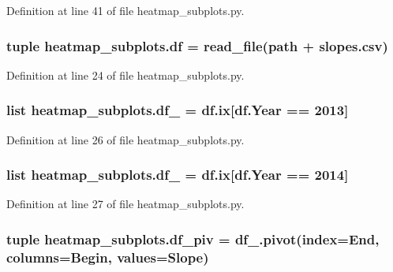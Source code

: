Definition at line 41 of file heatmap\+\_\+subplots.\+py.

\hypertarget{namespaceheatmap__subplots_aefdcfb560a154ac398cf52bf39a33cb0}{}
\subsubsection[{df}]{\setlength{\rightskip}{0pt plus 5cm}tuple heatmap\+\_\+subplots.\+df = {\bf read\+\_\+file}({\bf path} + \textquotesingle{}slopes.\+csv\textquotesingle{})}\label{namespaceheatmap__subplots_aefdcfb560a154ac398cf52bf39a33cb0}


Definition at line 24 of file heatmap\+\_\+subplots.\+py.

\hypertarget{namespaceheatmap__subplots_a38f24e9de53aa8a935925a0154e4b576}{}
\subsubsection[{df\+\_\+13}]{\setlength{\rightskip}{0pt plus 5cm}list heatmap\+\_\+subplots.\+df\+\_ = df.\+ix\mbox{[}df.\+Year == 2013\mbox{]}}\label{namespaceheatmap__subplots_a38f24e9de53aa8a935925a0154e4b576}


Definition at line 26 of file heatmap\+\_\+subplots.\+py.

\hypertarget{namespaceheatmap__subplots_a664795795d2c75a026821e0bd2a32159}{}
\subsubsection[{df\+\_\+14}]{\setlength{\rightskip}{0pt plus 5cm}list heatmap\+\_\+subplots.\+df\+\_ = df.\+ix\mbox{[}df.\+Year == 2014\mbox{]}}\label{namespaceheatmap__subplots_a664795795d2c75a026821e0bd2a32159}


Definition at line 27 of file heatmap\+\_\+subplots.\+py.

\hypertarget{namespaceheatmap__subplots_af3b54e7f6c49dd1ad4ed6d5cef1541d0}{}
\subsubsection[{df\+\_\+piv}]{\setlength{\rightskip}{0pt plus 5cm}tuple heatmap\+\_\+subplots.\+df\+\_\+piv = df\+\_.\+pivot(index=\textquotesingle{}End\textquotesingle{}, columns=\textquotesingle{}Begin\textquotesingle{}, values=\textquotesingle{}Slope\textquotesingle{})}\label{namespaceheatmap__subplots_af3b54e7f6c49dd1ad4ed6d5cef1541d0}


